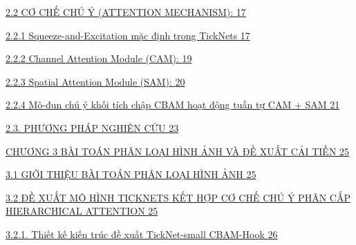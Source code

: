 \documentclass[
]{article}
\begin{document}
\protect\hyperlink{cux1a1-chux1ebf-chuxfa-uxfd-attention-mechanism}{2.2
CƠ CHẾ CHÚ Ý (ATTENTION MECHANISM):
\protect\hyperlink{cux1a1-chux1ebf-chuxfa-uxfd-attention-mechanism}{17}}

\protect\hyperlink{squeeze-and-excitation-mux1eb7c-ux111ux1ecbnh-trong-ticknets}{2.2.1
Squeeze-and-Excitation mặc định trong TickNets
\protect\hyperlink{squeeze-and-excitation-mux1eb7c-ux111ux1ecbnh-trong-ticknets}{17}}

\protect\hyperlink{channel-attention-module-cam}{2.2.2 Channel Attention
Module (CAM): \protect\hyperlink{channel-attention-module-cam}{19}}

\protect\hyperlink{spatial-attention-module-sam}{2.2.3 Spatial Attention
Module (SAM): \protect\hyperlink{spatial-attention-module-sam}{20}}

\protect\hyperlink{muxf4-ux111un-chuxfa-uxfd-khux1ed1i-tuxedch-chux1eadp-cbam-houx1ea1t-ux111ux1ed9ng-tuux1ea7n-tux1ef1-cam-sam}{2.2.4
Mô-đun chú ý khối tích chập CBAM hoạt động tuần tự CAM + SAM
\protect\hyperlink{muxf4-ux111un-chuxfa-uxfd-khux1ed1i-tuxedch-chux1eadp-cbam-houx1ea1t-ux111ux1ed9ng-tuux1ea7n-tux1ef1-cam-sam}{21}}

\protect\hyperlink{phux1b0ux1a1ng-phuxe1p-nghiuxean-cux1ee9u}{2.3.
PHƯƠNG PHÁP NGHIÊN CỨU
\protect\hyperlink{phux1b0ux1a1ng-phuxe1p-nghiuxean-cux1ee9u}{23}}

\protect\hyperlink{chux1b0ux1a1ng-3-buxe0i-touxe1n-phuxe2n-loux1ea1i-huxecnh-ux1ea3nh-vuxe0-ux111ux1ec1-xuux1ea5t-cux1ea3i-tiux1ebfn}{CHƯƠNG
3 BÀI TOÁN PHÂN LOẠI HÌNH ẢNH VÀ ĐỀ XUẤT CẢI TIẾN
\protect\hyperlink{chux1b0ux1a1ng-3-buxe0i-touxe1n-phuxe2n-loux1ea1i-huxecnh-ux1ea3nh-vuxe0-ux111ux1ec1-xuux1ea5t-cux1ea3i-tiux1ebfn}{25}}

\protect\hyperlink{giux1edbi-thiux1ec7u-buxe0i-touxe1n-phuxe2n-loux1ea1i-huxecnh-ux1ea3nh}{3.1
GIỚI THIỆU BÀI TOÁN PHÂN LOẠI HÌNH ẢNH
\protect\hyperlink{giux1edbi-thiux1ec7u-buxe0i-touxe1n-phuxe2n-loux1ea1i-huxecnh-ux1ea3nh}{25}}

\protect\hyperlink{ux111ux1ec1-xuux1ea5t-muxf4-huxecnh-ticknets-kux1ebft-hux1ee3p-cux1a1-chux1ebf-chuxfa-uxfd-phuxe2n-cux1ea5p-hierarchical-attention}{3.2
ĐỀ XUẤT MÔ HÌNH TICKNETS KẾT HỢP CƠ CHẾ CHÚ Ý PHÂN CẤP HIERARCHICAL
ATTENTION
\protect\hyperlink{ux111ux1ec1-xuux1ea5t-muxf4-huxecnh-ticknets-kux1ebft-hux1ee3p-cux1a1-chux1ebf-chuxfa-uxfd-phuxe2n-cux1ea5p-hierarchical-attention}{25}}

\protect\hyperlink{thiux1ebft-kux1ebf-kiux1ebfn-truxfac-ux111ux1ec1-xuux1ea5t-ticknet-small-cbam-hook}{3.2.1.
Thiết kế kiến trúc đề xuất TickNet-small CBAM-Hook
\protect\hyperlink{thiux1ebft-kux1ebf-kiux1ebfn-truxfac-ux111ux1ec1-xuux1ea5t-ticknet-small-cbam-hook}{26}}
\end{document}
